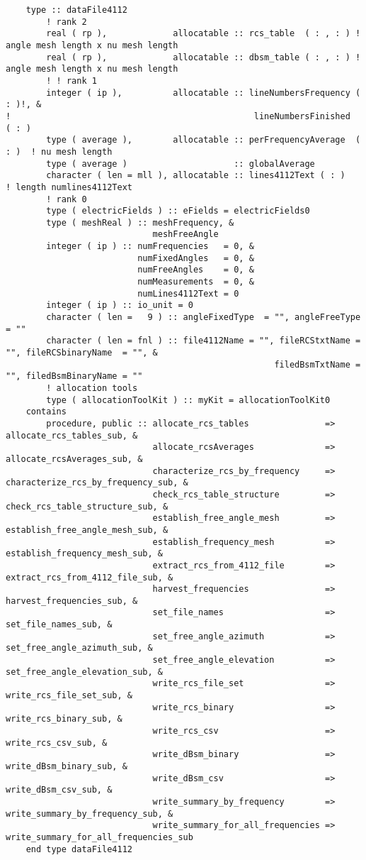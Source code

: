 {{\begin{lstlisting}
    type :: dataFile4112
        ! rank 2
        real ( rp ),             allocatable :: rcs_table  ( : , : ) ! angle mesh length x nu mesh length
        real ( rp ),             allocatable :: dbsm_table ( : , : ) ! angle mesh length x nu mesh length
        ! ! rank 1
        integer ( ip ),          allocatable :: lineNumbersFrequency ( : )!, &
!                                                lineNumbersFinished  ( : )
        type ( average ),        allocatable :: perFrequencyAverage  ( : )  ! nu mesh length
        type ( average )                     :: globalAverage
        character ( len = mll ), allocatable :: lines4112Text ( : )        ! length numlines4112Text
        ! rank 0
        type ( electricFields ) :: eFields = electricFields0
        type ( meshReal ) :: meshFrequency, &
                             meshFreeAngle
        integer ( ip ) :: numFrequencies   = 0, &
                          numFixedAngles   = 0, &
                          numFreeAngles    = 0, &
                          numMeasurements  = 0, &
                          numLines4112Text = 0
        integer ( ip ) :: io_unit = 0
        character ( len =   9 ) :: angleFixedType  = "", angleFreeType = ""
        character ( len = fnl ) :: file4112Name = "", fileRCStxtName = "", fileRCSbinaryName  = "", &
                                                     filedBsmTxtName = "", filedBsmBinaryName = ""
        ! allocation tools
        type ( allocationToolKit ) :: myKit = allocationToolKit0
    contains
        procedure, public :: allocate_rcs_tables               => allocate_rcs_tables_sub, &
                             allocate_rcsAverages              => allocate_rcsAverages_sub, &
                             characterize_rcs_by_frequency     => characterize_rcs_by_frequency_sub, &
                             check_rcs_table_structure         => check_rcs_table_structure_sub, &
                             establish_free_angle_mesh         => establish_free_angle_mesh_sub, &
                             establish_frequency_mesh          => establish_frequency_mesh_sub, &
                             extract_rcs_from_4112_file        => extract_rcs_from_4112_file_sub, &
                             harvest_frequencies               => harvest_frequencies_sub, &
                             set_file_names                    => set_file_names_sub, &
                             set_free_angle_azimuth            => set_free_angle_azimuth_sub, &
                             set_free_angle_elevation          => set_free_angle_elevation_sub, &
                             write_rcs_file_set                => write_rcs_file_set_sub, &
                             write_rcs_binary                  => write_rcs_binary_sub, &
                             write_rcs_csv                     => write_rcs_csv_sub, &
                             write_dBsm_binary                 => write_dBsm_binary_sub, &
                             write_dBsm_csv                    => write_dBsm_csv_sub, &
                             write_summary_by_frequency        => write_summary_by_frequency_sub, &
                             write_summary_for_all_frequencies => write_summary_for_all_frequencies_sub
    end type dataFile4112


\end{lstlisting}}}
